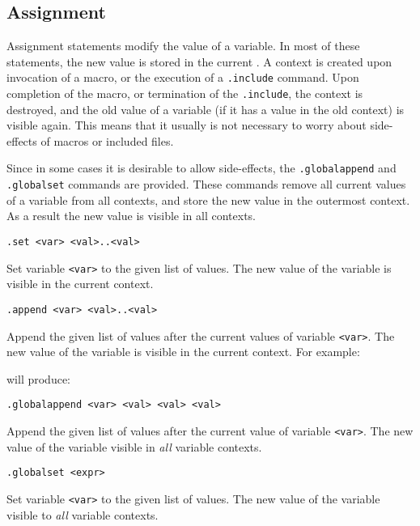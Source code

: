 \subsection{Assignment}
\label{s.assignment}
Assignment statements modify the value of a variable. In most of these
statements, the new value is stored in the current .
A context is created upon invocation of a macro, or the execution of a
\verb'.include' command. Upon completion of the macro, or termination
of the \verb'.include', the context is destroyed, and the old value of
a variable (if it has a value in the old context) is visible again.
This means that it usually is not necessary to worry about side-effects
of macros or included files.

Since in some cases it is desirable to allow side-effects, the
\verb'.globalappend' and \verb'.globalset' commands are provided.
These commands remove all current values of a variable from all
contexts, and store the new value in the outermost context. As a result
the new value is visible in all contexts.
\begin{verbatim}
.set <var> <val>..<val>
\end{verbatim}
\begin{desc}
Set variable \texttt{<var>} to the given list of values.
The new value of the variable is visible in the current context.
\end{desc}
\begin{verbatim}
.append <var> <val>..<val>
\end{verbatim}
\begin{desc}
Append the given list of values after the current values of variable
\texttt{<var>}.
The new value of the variable is visible in the current context.
For example:
\begin{showfile}

\end{showfile}
will produce:
\begin{showfile}

\end{showfile}
\end{desc}
\begin{verbatim}
.globalappend <var> <val> <val> <val>
\end{verbatim}
\begin{desc}
Append the given list of values after the current value of variable
\verb'<var>'. The new value of the variable visible in \emph{all}
variable contexts.
\end{desc}
\begin{verbatim}
.globalset <expr>
\end{verbatim}
\begin{desc}
Set variable \verb'<var>' to the given list of values.  The new value
of the variable visible to \emph{all} variable contexts.
\end{desc}
